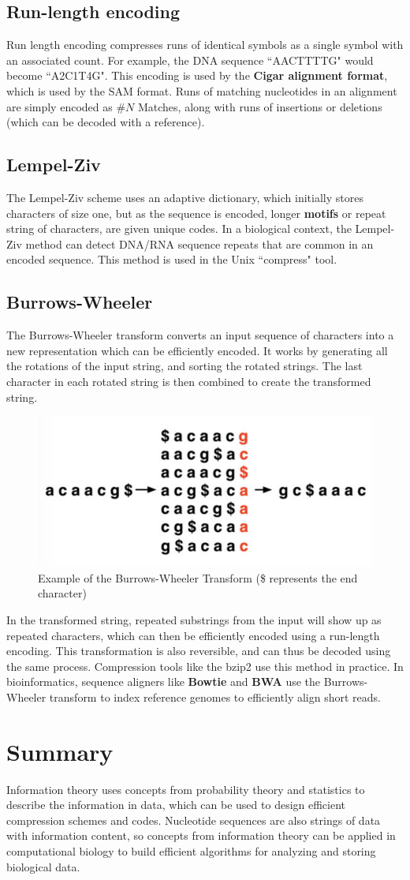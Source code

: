 \documentclass[12pt]{article}
\begin{document}
\subsection{Run-length encoding}
Run length encoding compresses runs of identical symbols as a single symbol with an associated count. For example, the DNA sequence ``AACTTTTG" would become ``A2C1T4G". This encoding is used by the \textbf{Cigar alignment format}, which is used by the SAM format. Runs of matching nucleotides in an alignment are simply encoded as \#$N$ Matches, along with runs of insertions or deletions (which can be decoded with a reference).
\subsection{Lempel-Ziv}
The Lempel-Ziv scheme uses an adaptive dictionary, which initially stores characters of size one, but as the sequence is encoded, longer \textbf{motifs} or repeat string of characters, are given unique codes. In a biological context, the Lempel-Ziv method can detect DNA/RNA sequence repeats that are common in an encoded sequence. This method is used in the Unix ``compress" tool.
\subsection{Burrows-Wheeler}
The Burrows-Wheeler transform converts an input sequence of characters into a new representation which can be efficiently encoded. It works by generating all the rotations of the input string, and sorting the rotated strings. The last character in each rotated string is then combined to create the transformed string.
\begin{figure}[ht]
    \centering
    \includegraphics[width=.5\linewidth]{bw.png}
    \caption{Example of the Burrows-Wheeler Transform (\$ represents the end character)}
    \label{fig:my_label}
\end{figure}
In the transformed string, repeated substrings from the input will show up as repeated characters, which can then be efficiently encoded using a run-length encoding. This transformation is also reversible, and can thus be decoded using the same process. Compression tools like the bzip2 use this method in practice. In bioinformatics, sequence aligners like \textbf{Bowtie} and \textbf{BWA} use the Burrows-Wheeler transform to index reference genomes to efficiently align short reads.
\section{Summary}
Information theory uses concepts from probability theory and statistics to describe the information in data, which can be used to design efficient compression schemes and codes. Nucleotide sequences are also strings of data with information content, so concepts from information theory can be applied in computational biology to build efficient algorithms for analyzing and storing biological data.
\end{document}
